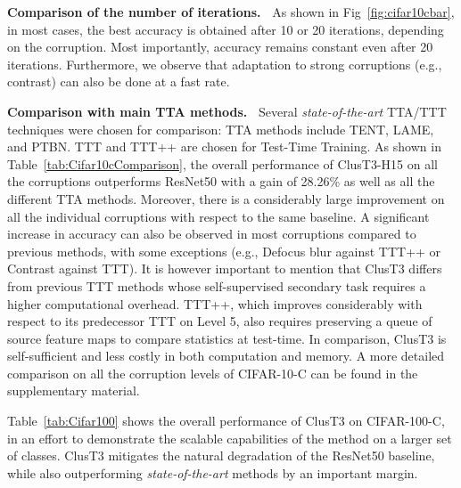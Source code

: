\documentclass{article}
\newcommand{\mypar}[1]{\vspace{3pt}\noindent\textbf{#1~}}
\begin{document}
\mypar{Comparison of the number of iterations.} As shown in Fig~\ref{fig:cifar10cbar}, in most cases, the best accuracy is obtained after 10 or 20 iterations, depending on the corruption. Most importantly, accuracy remains constant even after 20 iterations. Furthermore, we observe that adaptation to strong corruptions (e.g., contrast) can also be done at a fast rate.

\mypar{Comparison with main TTA methods.} Several \emph{state-of-the-art} TTA/TTT techniques were chosen for comparison: TTA methods include TENT\cite{tent2021}, LAME\cite{lame2022}, and PTBN\cite{PTBN}. TTT\cite{ttt} and TTT++\cite{ttt++} are chosen for Test-Time Training. As shown in Table~\ref{tab:Cifar10cComparison}, the overall performance of ClusT3-H15 on all the corruptions outperforms ResNet50 with a gain of 28.26\% as well as all the different TTA methods.
Moreover, there is a considerably large improvement on all the individual corruptions with respect to the same baseline. A significant increase in accuracy can also be observed in most corruptions compared to previous methods, with some exceptions (e.g., Defocus blur against TTT++\cite{ttt++} or Contrast against TTT\cite{ttt}). It is however important to mention that ClusT3 differs from previous TTT methods whose self-supervised secondary task requires a higher computational overhead. TTT++, which improves considerably with respect to its predecessor TTT on Level 5, also requires preserving a queue of source feature maps to compare statistics at test-time. In comparison, ClusT3 is self-sufficient and less costly in both computation and memory. A more detailed comparison on all the corruption levels of CIFAR-10-C can be found in the supplementary material.

Table~\ref{tab:Cifar100} shows the overall performance of ClusT3 on CIFAR-100-C, in an effort to demonstrate the scalable capabilities of the method on a larger set of classes. ClusT3 mitigates the natural degradation of the ResNet50 baseline, while also outperforming \emph{state-of-the-art} methods by an important margin.

\end{document}
